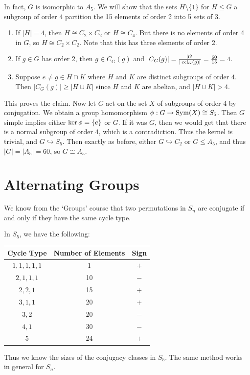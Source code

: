 \documentclass[a4paper]{scrartcl}
\begin{document}
\begin{example}
In fact, $G$ is isomorphic to $A_5$. We will show that the sets $H \setminus \{1\}$ for $H \leq G$ a subgroup of order 4 partition the 15 elements of order 2 into 5 sets of 3.
\begin{enumerate}
	\item If $|H| = 4$, then $H \cong C_2 \times C_2$ or $H \cong C_4$. But there is no elements of order 4 in $G$, so $H \cong C_2 \times C_2$. Note that this has three elements of order 2.
	\item If $g \in G$ has order 2, then $g \in C_G(g)$ and $|C_G(g)| = \frac{|G|}{|\operatorname{ccl}_G(g)|} = \frac{60}{15} = 4$.
	\item Suppose $e \neq g \in H \cap K$ where $H$ and $K$ are distinct subgroups of order $4$. Then $|C_G(g)| \geq |H \cup K|$ since $H$ and $K$ are abelian, and $|H \cup K| > 4$.
\end{enumerate}
This proves the claim. Now let $G$ act on the set $X$ of subgroups of order 4 by conjugation. We obtain a group homomorphism $\phi:G \rightarrow \operatorname{Sym}(X) \cong S_5$. Then $G$ simple implies either $\operatorname{ker} \phi = \{e\}$ or $G$. If it was $G$, then we would get that there is a normal subgroup of order $4$, which is a contradiction. Thus the kernel is trivial, and $G \hookrightarrow S_5$. Then exactly as before, either $G \hookrightarrow C_2$ or $G \leq A_5$, and thus $|G| = |A_5| = 60$, so $G \cong A_5$.
\end{example}

\section{Alternating Groups}

We know from the `Groups' course that two permutations in $S_n$ are conjugate if and only if they have the same cycle type.

\begin{example}
	In $S_5$, we have the following:
	\begin{center}
		\begin{tabular}{@{}ccc@{}}
			\toprule
			Cycle Type    & Number of Elements & Sign \\ \midrule
			$1, 1, 1, 1, 1$  & 1   &   $+$  \\ 
			$2, 1, 1, 1$  & 10   &   $-$  \\
			$2, 2, 1$  & 15   &   $+$  \\
			$3, 1, 1$  & 20   &   $+$  \\
			$3, 2$  & 20   &   $-$  \\
			$4, 1$  & 30   &   $-$  \\
			$5$  & 24   &   $+$  \\
			\bottomrule
			\end{tabular}
	\end{center}
	Thus we know the sizes of the conjugacy classes in $S_5$. The same method works in general for $S_n$.
\end{example}
\end{document}
